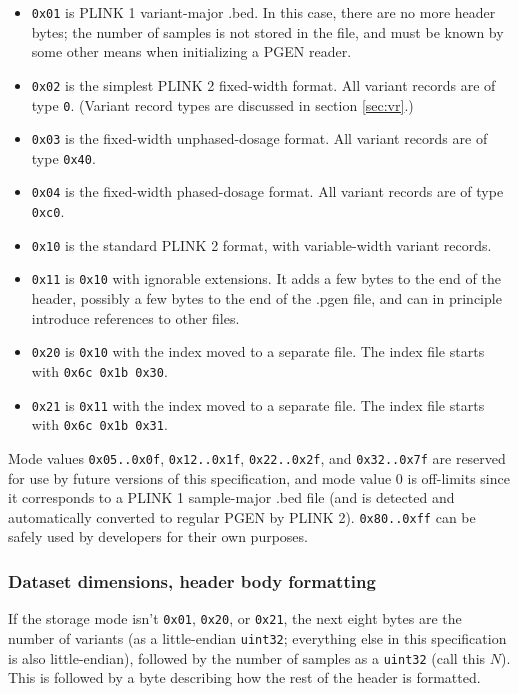 \documentclass[8pt]{article}
\begin{document}
\begin{itemize}
  \itemsep0em
\item \texttt{0x01} is PLINK 1 variant-major .bed.  In this case, there are no
  more header bytes; the number of samples is not stored in the file, and must
  be known by some other means when initializing a PGEN reader.
\item \texttt{0x02} is the simplest PLINK 2 fixed-width format.  All variant
  records are of type \texttt{0}.  (Variant record types are discussed in
  section \ref{sec:vr}.)
\item \texttt{0x03} is the fixed-width unphased-dosage format.  All variant
  records are of type \texttt{0x40}.
\item \texttt{0x04} is the fixed-width phased-dosage format.  All variant
  records are of type \texttt{0xc0}.
\item \texttt{0x10} is the standard PLINK 2 format, with variable-width variant
  records.
\item \texttt{0x11} is \texttt{0x10} with ignorable extensions.  It adds a few bytes to the end of the header, possibly a few bytes to the end of the .pgen file, and can in principle introduce references to other files.
\item \texttt{0x20} is \texttt{0x10} with the index moved to a separate file.  The index file starts with \texttt{0x6c 0x1b 0x30}.
\item \texttt{0x21} is \texttt{0x11} with the index moved to a separate file.  The index file starts with \texttt{0x6c 0x1b 0x31}.
\end{itemize}

Mode values \texttt{0x05..0x0f}, \texttt{0x12..0x1f}, \texttt{0x22..0x2f}, and
\texttt{0x32..0x7f} are reserved for use by future versions of this
specification, and mode value 0 is off-limits since it corresponds to a PLINK 1
sample-major .bed file (and is detected and automatically converted to regular
PGEN by PLINK 2).
\texttt{0x80..0xff} can be safely used by developers for their own purposes.

\subsubsection{Dataset dimensions, header body formatting}

If the storage mode isn't \texttt{0x01}, \texttt{0x20}, or \texttt{0x21}, the
next eight bytes are the number of variants (as a little-endian
\texttt{uint32}; everything else in this specification is also little-endian),
followed by the number of samples as a \texttt{uint32} (call this $N$).  This
is followed by a byte describing how the rest of the header is formatted.
\end{document}
